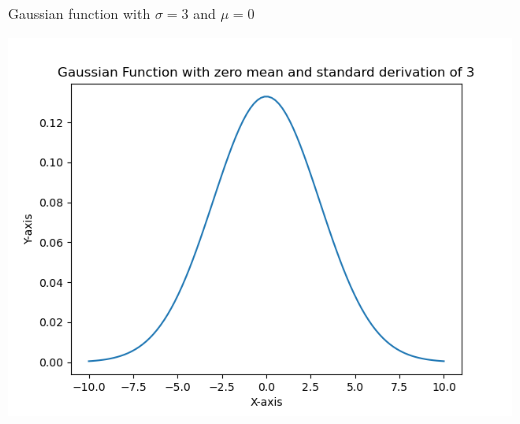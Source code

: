 \documentclass[letterpaper,12pt]{article}
\begin{document}
\begin{table}[!h]
    \centering
    \caption{Gaussian function with $\sigma = 3$ and $\mu = 0$}
    \includegraphics{gaussian.png}
    \label{plot}%
  \end{table}%
\end{document}

